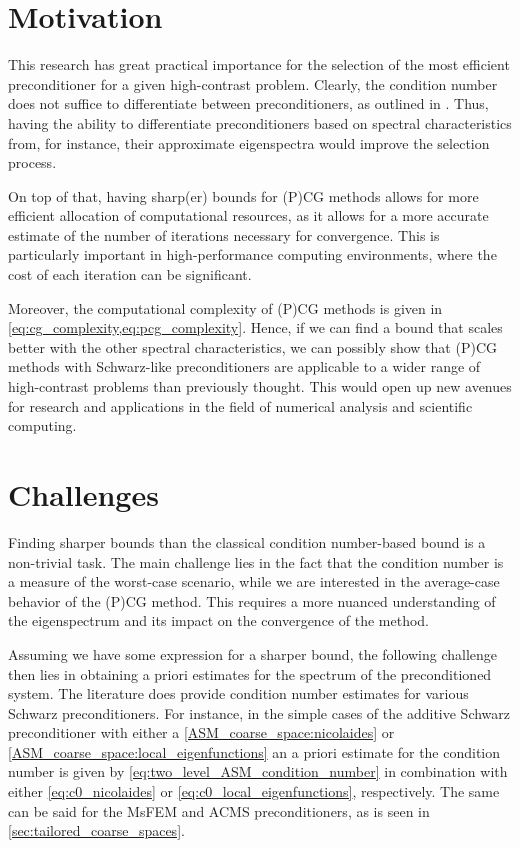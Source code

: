 \section{Motivation}
This research has great practical importance for the selection of the most efficient preconditioner for a given high-contrast problem. Clearly, the condition number does not suffice to differentiate between preconditioners, as outlined in \cite{ams_coarse_space_comp_study_Alves2024}. Thus, having the ability to differentiate preconditioners based on spectral characteristics from, for instance, their approximate eigenspectra would improve the selection process.

On top of that, having sharp(er) bounds for (P)CG methods allows for more efficient allocation of computational resources, as it allows for a more accurate estimate of the number of iterations necessary for convergence. This is particularly important in high-performance computing environments, where the cost of each iteration can be significant.

Moreover, the computational complexity of (P)CG methods is given in \cref{eq:cg_complexity,eq:pcg_complexity}. Hence, if we can find a bound that scales better with the other spectral characteristics, we can possibly show that (P)CG methods with Schwarz-like preconditioners are applicable to a wider range of high-contrast problems than previously thought. This would open up new avenues for research and applications in the field of numerical analysis and scientific computing.

\section{Challenges}\label{sec:challenges}
Finding sharper bounds than the classical condition number-based bound is a non-trivial task. The main challenge lies in the fact that the condition number is a measure of the worst-case scenario, while we are interested in the average-case behavior of the (P)CG method. This requires a more nuanced understanding of the eigenspectrum and its impact on the convergence of the method.

Assuming we have some expression for a sharper bound, the following challenge then lies in obtaining a priori estimates for the spectrum of the preconditioned system. The literature does provide condition number estimates for various Schwarz preconditioners. For instance, in the simple cases of the additive Schwarz preconditioner with either a \ref{ASM_coarse_space:nicolaides} or \ref{ASM_coarse_space:local_eigenfunctions} an a priori estimate for the condition number is given by \cref{eq:two_level_ASM_condition_number} in combination with either \cref{eq:c0_nicolaides} or \cref{eq:c0_local_eigenfunctions}, respectively. The same can be said for the MsFEM and ACMS preconditioners, as is seen in \cref{sec:tailored_coarse_spaces}.

